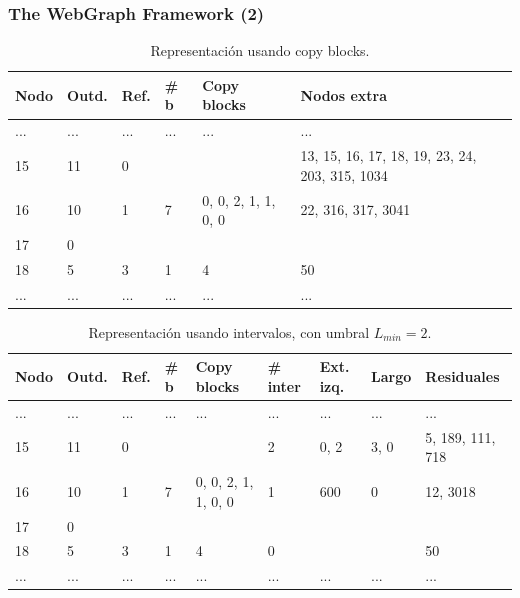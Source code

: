 \begin{frame}
\frametitle{The WebGraph Framework (2)}

\begin{table}%
\caption{Representación usando copy blocks.}
\centering
\tiny

\begin{tabular}{|l|l|l|l|l|l|}
	\toprule
	Nodo & Outd. & Ref. & \# b & Copy blocks & Nodos extra \\
	\midrule
	... & ... & ... & ... & ... & ... \\
	15 & 11 & 0 &  &  & 13, 15, 16, 17, 18, 19, 23, 24, 203, 315, 1034 \\
	16 & 10 & 1 & 7 & 0, 0, 2, 1, 1, 0, 0 & 22, 316, 317, 3041 \\
	17 & 0 &  &  &  & \\
	18 & 5 & 3 & 1 & 4 & 50 \\
	... & ... & ... & ... & ... & ... \\
\end{tabular}
\end{table}

\begin{table}%
\caption{Representación usando intervalos, con umbral $L_{min} = 2$.}
\centering
\tiny

\begin{tabular}{|l|l|l|l|l|l|l|l|l|}
	\toprule
	Nodo & Outd. & Ref. & \# b & Copy blocks & \# inter & Ext. izq. & Largo & Residuales \\
	\midrule
	... & ... & ... & ... & ... & ...  & ...  & ...  & ... \\
	15 & 11 & 0 &  &  & 2 & 0, 2 & 3, 0 & 5, 189, 111, 718 \\
	16 & 10 & 1 & 7 & 0, 0, 2, 1, 1, 0, 0 & 1 & 600 & 0 & 12, 3018 \\
	17 & 0 &  &  &  &  &  &  & \\
	18 & 5 & 3 & 1 & 4 & 0 &  &  & 50 \\
	... & ... & ... & ... & ... & ...  & ...  & ...  & ... \\
\end{tabular}
\end{table} 

\end{frame}


